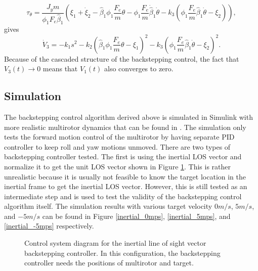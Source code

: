 \begin{equation}
\tau_\theta=\frac{J_ym}{\phi_1F_e\hat{\beta}_1}
(\xi_1+\dot{\xi}_2-\hat{\beta}_1\phi_1\frac{F_e}{m}\theta-\phi_1\frac{F_e}{m}\dot{\hat{\beta}}_1\dot{\theta}-k_3(\phi_1\frac{F_e}{m}\hat{\beta}_1\dot{\theta}-\xi_2)),
\end{equation}
gives
\begin{equation}
\dot{V}_3=-k_1s^2-k_2(\hat{\beta}_1\phi_1\frac{F_e}{m}\theta-\xi_1)^2-k_3(\phi_1\frac{F_e}{m}\hat{\beta}_1\dot{\theta}-\xi_2)^2.
\end{equation}
Because of the cascaded structure of the backstepping control, the fact that $V_3(t)\rightarrow 0$ means that $V_1(t)$ also converges to zero.

\subsection{Simulation}
The backstepping control algorithm derived above is simulated in Simulink with more realistic multirotor dynamics that can be found in {\cite{Beard2008}}. The simulation only tests the forward motion control of the multirotor by having separate PID controller to keep roll and yaw motions unmoved. There are two types of backstepping controller tested. The first is using the inertial LOS vector and normalize it to get the unit LOS vector shown in Figure \ref{system_inertial}. This is rather unrealistic because it is usually not feasible to know the target location in the inertial frame to get the inertial LOS vector. However, this is still tested as an intermediate step and is used to test the validity of the backstepping control algorithm itself. The simulation results with various target velocity $0m/s$, $5m/s$, and $-5m/s$ can be found in Figure \ref{inertial_0mps}, \ref{inertial_5mps}, and \ref{inertial_-5mps} respectively.
\begin{figure}[htbp]
	\centering
	\caption{Control system diagram for the inertial line of sight vector backstepping controller. In this configuration, the backstepping controller needs the positions of multirotor and target.}
	\label{system_inertial}
\end{figure}

